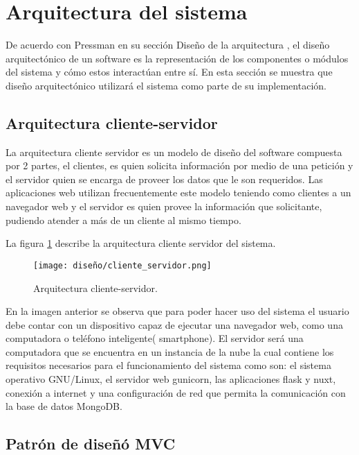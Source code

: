 \section{Arquitectura del sistema}

De acuerdo con Pressman\cite{pressman_software_2005} en su sección Diseño de la arquitectura , el diseño arquitectónico de un software es la representación de los componentes o módulos del sistema y cómo estos interactúan entre sí. En esta sección se muestra que diseño arquitectónico utilizará el sistema como parte de su implementación.

\subsection{Arquitectura cliente-servidor}

La arquitectura cliente servidor es un modelo de diseño del software compuesta por 2 partes, el clientes, es quien solicita información por medio de una petición y el servidor quien se encarga de proveer los datos que le son requeridos. Las aplicaciones web utilizan frecuentemente este modelo teniendo como clientes a un navegador web y el servidor es quien provee la información que solicitante, pudiendo atender a más de un cliente al mismo tiempo.

La figura \ref{img:arq_client_server} describe la arquitectura cliente servidor del sistema.

\begin{figure}[H]
    \centering
    \texttt{[image: diseño/cliente\_servidor.png]}
    \caption{Arquitectura cliente-servidor.}
    \label{img:arq_client_server}
\end{figure}


En la imagen anterior se observa que para poder hacer uso del sistema el usuario debe contar con un dispositivo capaz de ejecutar una navegador web, como una computadora o teléfono inteligente( smartphone). El servidor será una computadora que se encuentra en un instancia de la nube la cual contiene los requisitos necesarios para el funcionamiento del sistema como son: el sistema operativo GNU/Linux, el servidor web gunicorn, las aplicaciones flask y nuxt, conexión a internet y una configuración de red   que permita la comunicación con la base de datos MongoDB.


\subsection{Patrón de diseñó MVC}

